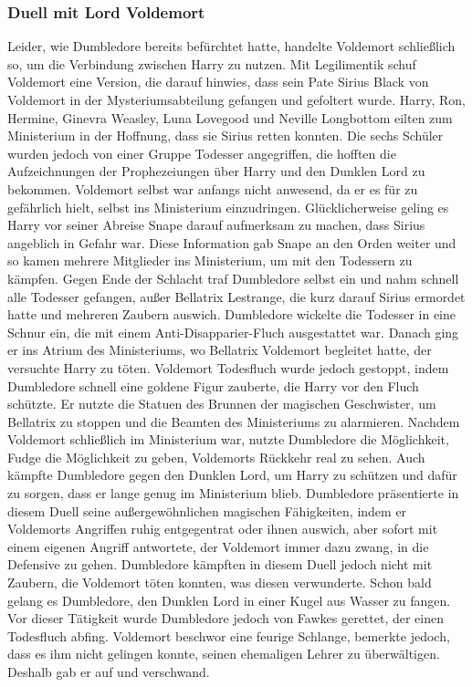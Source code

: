 \documentclass[a4paper, 10pt]{article}
\begin{document}
\subsubsection*{Duell mit Lord Voldemort}
Leider, wie Dumbledore bereits befürchtet hatte, handelte Voldemort schließlich so, um die Verbindung zwischen Harry zu nutzen. Mit Legilimentik schuf Voldemort eine Version, die darauf hinwies, dass sein Pate Sirius Black von Voldemort in der Mysteriumsabteilung gefangen und gefoltert wurde. Harry, Ron, Hermine, Ginevra Weasley, Luna Lovegood und Neville Longbottom eilten zum Ministerium in der Hoffnung, dass sie Sirius retten konnten. Die sechs Schüler wurden jedoch von einer Gruppe Todesser angegriffen, die hofften die Aufzeichnungen der Prophezeiungen über Harry und den Dunklen Lord zu bekommen. Voldemort selbst war anfangs nicht anwesend, da er es für zu gefährlich hielt, selbst ins Ministerium einzudringen. Glücklicherweise geling es Harry vor seiner Abreise Snape darauf aufmerksam zu machen, dass Sirius angeblich in Gefahr war. Diese Information gab Snape an den Orden weiter und so kamen mehrere Mitglieder ins Ministerium, um mit den Todessern zu kämpfen.
\vspace{10pt}
\newline
{}  
Gegen Ende der Schlacht traf Dumbledore selbst ein und nahm schnell alle Todesser gefangen, außer Bellatrix Lestrange, die kurz darauf Sirius ermordet hatte und mehreren Zaubern auswich. Dumbledore wickelte die Todesser in eine Schnur ein, die mit einem Anti-Disapparier-Fluch ausgestattet war. Danach ging er ins Atrium des Ministeriums, wo Bellatrix Voldemort begleitet hatte, der versuchte Harry zu töten.
\vspace{10pt}
\newline
{}  
Voldemort Todesfluch wurde jedoch gestoppt, indem Dumbledore schnell eine goldene Figur zauberte, die Harry vor den Fluch schützte. Er nutzte die Statuen des Brunnen der magischen Geschwister, um Bellatrix zu stoppen und die Beamten des Ministeriums zu alarmieren. Nachdem Voldemort schließlich im Ministerium war, nutzte Dumbledore die Möglichkeit, Fudge die Möglichkeit zu geben, Voldemorts Rückkehr real zu sehen. Auch kämpfte Dumbledore gegen den Dunklen Lord, um Harry zu schützen und dafür zu sorgen, dass er lange genug im Ministerium blieb. Dumbledore präsentierte in diesem Duell seine außergewöhnlichen magischen Fähigkeiten, indem er Voldemorts Angriffen ruhig entgegentrat oder ihnen auswich, aber sofort mit einem eigenen Angriff antwortete, der Voldemort immer dazu zwang, in die Defensive zu gehen. Dumbledore kämpften in diesem Duell jedoch nicht mit Zaubern, die Voldemort töten konnten, was diesen verwunderte. Schon bald gelang es Dumbledore, den Dunklen Lord in einer Kugel aus Wasser zu fangen. Vor dieser Tätigkeit wurde Dumbledore jedoch von Fawkes gerettet, der einen Todesfluch abfing. Voldemort beschwor eine feurige Schlange, bemerkte jedoch, dass es ihm nicht gelingen konnte, seinen ehemaligen Lehrer zu überwältigen. Deshalb gab er auf und verschwand.
\end{document}
